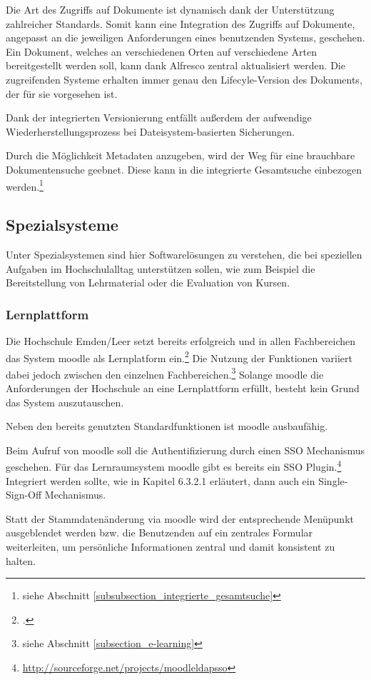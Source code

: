 Die Art des Zugriffs auf Dokumente ist dynamisch dank der Unterstützung zahlreicher Standards. Somit kann eine Integration des Zugriffs auf Dokumente, angepasst an die jeweiligen Anforderungen eines benutzenden Systems, geschehen. Ein Dokument, welches an verschiedenen Orten auf verschiedene Arten bereitgestellt werden soll, kann dank Alfresco zentral aktualisiert werden. Die zugreifenden Systeme erhalten immer genau den Lifecyle-Version des Dokuments, der für sie vorgesehen ist.

Dank der integrierten Versionierung entfällt außerdem der aufwendige Wiederherstellungsprozess bei Dateisystem-basierten Sicherungen.

Durch die Möglichkeit Metadaten anzugeben, wird der Weg für eine brauchbare Dokumentensuche geebnet. 
Diese kann in die integrierte Gesamtsuche einbezogen werden.\footnote{siehe Abschnitt \ref{subsubsection_integrierte_gesamtsuche}}

\subsection{Spezialsysteme}
Unter Spezialsystemen sind hier Softwarelösungen zu verstehen, die bei speziellen Aufgaben im Hochschulalltag unterstützen sollen, wie zum Beispiel die Bereitstellung von Lehrmaterial oder die Evaluation von Kursen.

\subsubsection{Lernplattform}
Die Hochschule Emden/Leer setzt bereits erfolgreich und in allen Fachbereichen das System moodle als Lernplatform ein.\footcite{gunter_muller_interview} 
Die Nutzung der Funktionen variiert dabei jedoch zwischen den einzelnen Fachbereichen.\footnote{siehe Abschnitt \ref{subsection_e-learning}}
Solange moodle die Anforderungen der Hochschule an eine Lernplattform erfüllt, besteht kein Grund das System auszutauschen.

Neben den bereits genutzten Standardfunktionen ist moodle ausbaufähig.

Beim Aufruf von moodle soll die Authentifizierung durch einen SSO Mechanismus geschehen. Für das Lernraumsystem moodle gibt es bereits ein SSO Plugin.\footnote{\url{http://sourceforge.net/projects/moodleldapsso}} Integriert werden sollte, wie in Kapitel 6.3.2.1 erläutert, dann auch ein Single-Sign-Off Mechanismus.

Statt der Stammdatenänderung via moodle wird der entsprechende Menüpunkt ausgeblendet werden bzw. die Benutzenden auf ein zentrales Formular weiterleiten, um persönliche Informationen zentral und damit konsistent zu halten.

